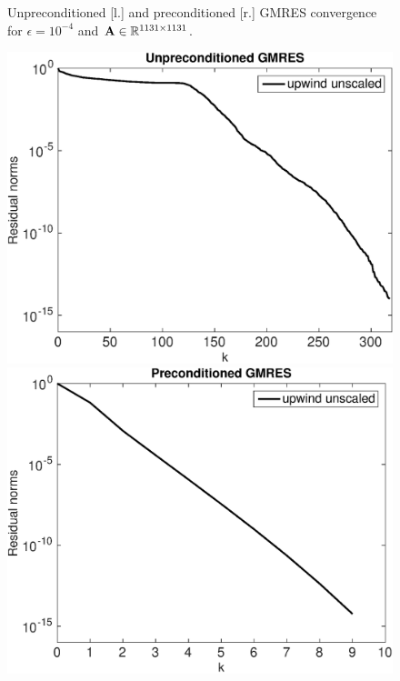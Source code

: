 \begin{figure}[tbhp]
\begin{minipage}[t]{0.5\linewidth}
\vspace*{-1em}
\end{minipage}
\vspace*{-1em}
\caption{Unpreconditioned [l.] and preconditioned [r.] GMRES convergence for $\epsilon=10^{-4}$ and $\mathbf{A} \in \mathbb{R}^{1131\times1131}$.}\label{fig:2D:prec3}
\end{figure}
%
\begin{figure}[tbhp]
\hspace*{-0.5em}
\begin{minipage}[t]{0.5\linewidth}
\includegraphics[width=0.95\linewidth]{figures/gmres_upwind2D_eps_1e-02_N_30_M_40}
\vspace*{-1em}
\end{minipage}
%
\begin{minipage}[t]{0.5\linewidth}
\includegraphics[width=0.95\linewidth]{figures/gmres_precond_upwind2D_eps_1e-02_N_30_M_40}

\end{minipage}
\end{figure}
